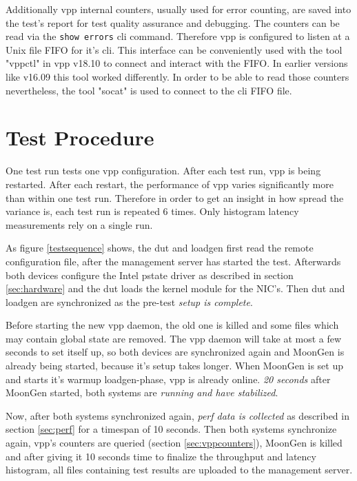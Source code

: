 Additionally \Ac{vpp} internal counters, usually used for error
counting, are saved into the test's report for test quality assurance
and debugging. The counters can be read via the \lstinline|show errors| 
\Ac{cli} command. Therefore \Ac{vpp} is configured to listen
at a Unix file FIFO for it's \Ac{cli}. This interface can be
conveniently used with the tool "vppctl" in \Ac{vpp} v18.10 to connect
and interact with the FIFO. In earlier versions like v16.09 this tool
worked differently. In order to be able to read those counters
nevertheless, the tool "socat" is used to connect to the \Ac{cli}
FIFO file.


\section{Test Procedure}

One test run tests one \Ac{vpp} configuration. After each test run,
\Ac{vpp} is being restarted. After each restart, the performance of
\Ac{vpp} varies significantly more than within one test run. Therefore
in order to get an insight in how spread the variance is, each test
run is repeated 6 times. Only histogram latency measurements rely on a
single run.

As figure \ref{testsequence} shows, the \Ac{dut} and \Ac{loadgen}
first read the remote configuration file, after the management server
has started the test. Afterwards both devices configure the Intel
pstate driver  as described in section \ref{sec:hardware} and the
\Ac{dut} loads the kernel module for the NIC's. Then \Ac{dut} and
\Ac{loadgen} are synchronized as the pre-test \textit{setup is
complete}.

Before starting the new \Ac{vpp} daemon, the old one is killed and
some files which may contain global state are removed. The \Ac{vpp}
daemon will take at most a few seconds to set itself up, so both
devices are synchronized again and MoonGen is already being started,
because it's setup takes longer. When MoonGen is set up and starts
it's warmup \Ac{loadgen}-phase, \Ac{vpp} is already online. \textit{20
seconds} after MoonGen started, both systems are \textit{running and
have stabilized}.

Now, after both systems synchronized again, \textit{\Ac{perf} data is
collected} as described in section \ref{sec:perf} for a timespan of 10
seconds. Then both systems synchronize again, \Ac{vpp}'s counters are
queried (section \ref{sec:vppcounters}), MoonGen is killed and after
giving it 10 seconds time to finalize the throughput and latency
histogram, all files containing test results are uploaded to the
management server.

